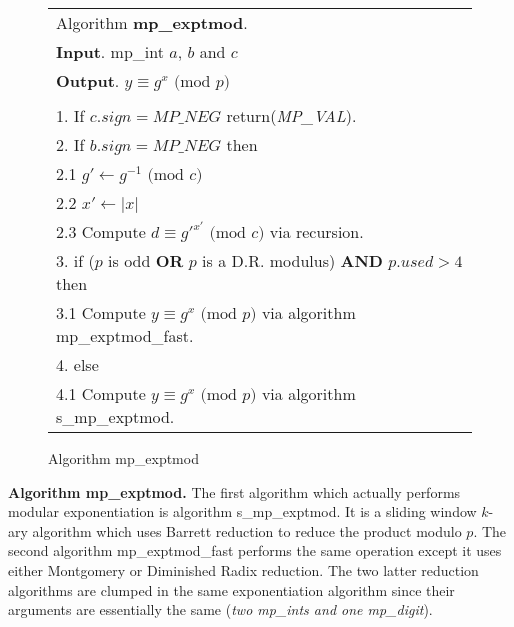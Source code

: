 \documentclass[b5paper]{book}
\begin{document}
\begin{figure}[!here]
\begin{small}
\begin{center}
\begin{tabular}{l}
\hline Algorithm \textbf{mp\_exptmod}. \\
\textbf{Input}.   mp\_int $a$, $b$ and $c$ \\
\textbf{Output}.  $y \equiv g^x \mbox{ (mod }p\mbox{)}$ \\
\hline \\
1.  If $c.sign = MP\_NEG$ return(\textit{MP\_VAL}). \\
2.  If $b.sign = MP\_NEG$ then \\
\hspace{3mm}2.1  $g' \leftarrow g^{-1} \mbox{ (mod }c\mbox{)}$ \\
\hspace{3mm}2.2  $x' \leftarrow \vert x \vert$ \\
\hspace{3mm}2.3  Compute $d \equiv g'^{x'} \mbox{ (mod }c\mbox{)}$ via recursion. \\
3.  if ($p$ is odd \textbf{OR} $p$ is a D.R. modulus) \textbf{AND} $p.used  > 4$ then \\
\hspace{3mm}3.1  Compute $y \equiv g^{x} \mbox{ (mod }p\mbox{)}$ via algorithm mp\_exptmod\_fast. \\
4.  else \\
\hspace{3mm}4.1  Compute $y \equiv g^{x} \mbox{ (mod }p\mbox{)}$ via algorithm s\_mp\_exptmod. \\
\hline
\end{tabular}
\end{center}
\end{small}
\caption{Algorithm mp\_exptmod}
\end{figure}

\textbf{Algorithm mp\_exptmod.}
The first algorithm which actually performs modular exponentiation is algorithm s\_mp\_exptmod.  It is a sliding window $k$-ary algorithm 
which uses Barrett reduction to reduce the product modulo $p$.  The second algorithm mp\_exptmod\_fast performs the same operation 
except it uses either Montgomery or Diminished Radix reduction.  The two latter reduction algorithms are clumped in the same exponentiation
algorithm since their arguments are essentially the same (\textit{two mp\_ints and one mp\_digit}).  
\end{document}
